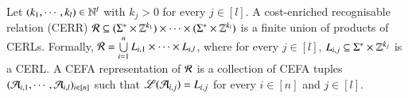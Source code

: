 \smallskip


\begin{definition}
Let $(k_1,\cdots, k_l) \in \mathbb{N}^l$ with $k_j > 0$ for every $j \in [l]$. A cost-enriched recognisable relation (CERR)  $\mathcal{R} \subseteq (\Sigma^* \times \mathbb{Z}^{k_1}) \times \cdots  \times (\Sigma^* \times \mathbb{Z}^{k_l})$ is a finite union of products of CERLs. Formally,
$\mathcal{R} = \bigcup \limits_{i=1}^n L_{i,1 } \times \cdots \times L_{i, l}$, 
	where for every $j \in [l]$, $L_{i,j} \subseteq \Sigma^* \times \mathbb{Z}^{k_j}$ is a CERL. 
	A CEFA representation of $\mathcal{R}$ is a collection of CEFA tuples $(\mathcal{A}_{i,1}, \cdots, \mathcal{A}_{i,l})_{i \in [n]}$ such that $\mathscr{L}(\mathcal{A}_{i,j}) = L_{i,j}$ for every $i \in [n]$ and $j \in [l]$.
\end{definition}

